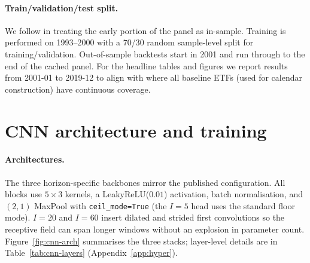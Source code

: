 \documentclass{article}
\begin{document}
\paragraph{Train/validation/test split.}
We follow \citet{jiang2023reimagining} in treating the early portion of
the panel as in-sample. Training is performed on 1993--2000 with a
70/30 random sample-level split for training/validation. Out-of-sample
backtests start in 2001 and run through to the end of the cached panel.
For the headline tables and figures we report results from 2001-01 to
2019-12 to align with where all baseline ETFs (used for calendar
construction) have continuous coverage.


\section{CNN architecture and training}
\label{sec:arch}

\paragraph{Architectures.}
The three horizon-specific backbones mirror the published configuration.
All blocks use $5\times3$ kernels, a LeakyReLU($0.01$) activation, batch
normalisation, and $(2,1)$ MaxPool with \texttt{ceil\_mode=True} (the $I=5$
head uses the standard floor mode). $I=20$ and $I=60$ insert dilated and
strided first convolutions so the receptive field can span longer windows
without an explosion in parameter count. Figure~\ref{fig:cnn-arch}
summarises the three stacks; layer-level details are in
Table~\ref{tab:cnn-layers} (Appendix~\ref{app:hyper}).
\end{document}
